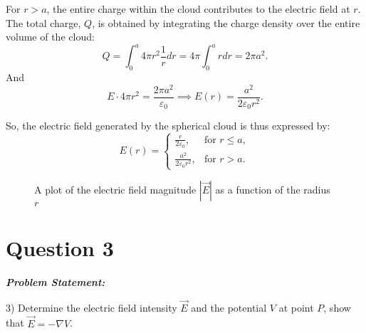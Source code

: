 \documentclass[12pt]{article}
\newenvironment{q}
{
    \begin{qframe}
    \noindent\textit{\textbf{Problem Statement:}}
    \par\smallskip
}
{
    \end{qframe}
}
\begin{document}
For \(r > a\), the entire charge within the cloud contributes to the electric field at \(r\). The total charge, \(Q\), is obtained by integrating the charge density over the entire volume of the cloud:
\[
Q = \int_0^a 4\pi r^2 \frac{1}{r} dr = 4\pi \int_0^a r dr = 2\pi a^2.
\]
And
\[
E \cdot 4\pi r^2 = \frac{2\pi a^2}{\varepsilon_0} \implies E(r) = \frac{a^2}{2\varepsilon_0 r^2}.
\]

So, the electric field generated by the spherical cloud is thus expressed by:\[
E(r) = \begin{cases}
\frac{r}{2\varepsilon_0}, & \text{for } r \leq a, \\
\frac{a^2}{2\varepsilon_0 r^2}, & \text{for } r > a.
\end{cases}
\]


\begin{figure}[ht!]
\centering
{}
\caption{A plot of the electric field magnitude \(|\vec{E}|\) as a function of the radius \(r\)}
\label{fig:EfieldPlot}
\end{figure}



\newpage
\section*{Question 3}
\begin{q}
3) Determine the electric field intensity \(\vec{E}\) and the potential \(V\) at point \(P\), show that \(\vec{E}=-\nabla V\).
\end{q}
\end{document}
